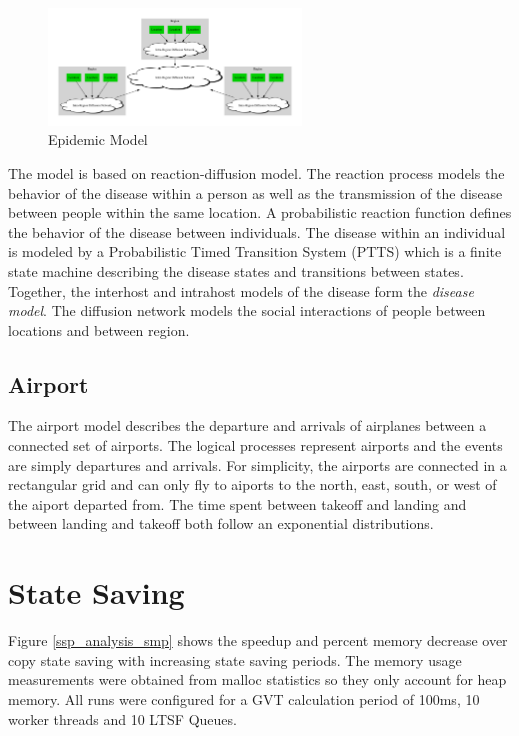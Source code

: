 \documentclass[11pt]{book}
\begin{document}
\begin{figure}[H]
    \centering
    \includegraphics[width=0.6\textwidth]{figs/graphviz/epidemic.pdf}
    \caption{Epidemic Model}\label{epidemic_model}
\end{figure}

The model is based on reaction-diffusion model\cite{perumalla-12}. The reaction process
models the behavior of the disease within a person as well as the transmission of the
disease between people within the same location. A probabilistic reaction function defines
the behavior of the disease between individuals\cite{barrett-08}. The disease within an
individual is modeled by a Probabilistic Timed Transition System (PTTS)\cite{barrett-08}
which is a finite state machine describing the disease states and transitions between states.
Together, the interhost and intrahost models of the disease form the \emph{disease model}.
The diffusion network models the social interactions of people between locations and between
region\cite{barrett-08}.

\subsection{Airport}

The airport model describes the departure and arrivals of airplanes between a connected
set of airports. The logical processes represent airports and the events are simply
departures and arrivals. For simplicity, the airports are connected in a rectangular grid
and can only fly to aiports to the north, east, south, or west of the aiport departed from.
The time spent between takeoff and landing and between landing and takeoff both follow an
exponential distributions.

\section{State Saving}

Figure \ref{ssp_analysis_smp} shows the speedup and percent memory decrease over copy state saving
with increasing state saving periods. The memory usage measurements were obtained from malloc
statistics so they only account for heap memory.  All runs were configured for a GVT calculation
period of 100ms, 10 worker threads and 10 LTSF Queues. 
\end{document}
